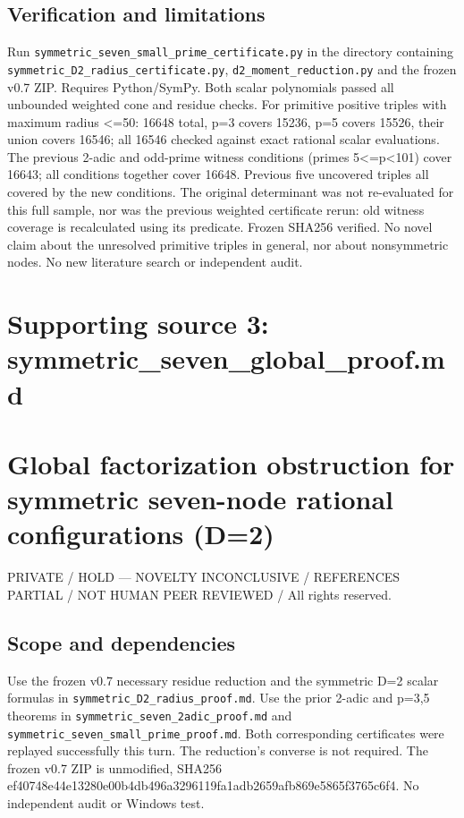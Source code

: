 \documentclass[
  10pt,
]{article}
\begin{document}
\subsection{Verification and
limitations}\label{verification-and-limitations}

Run \texttt{symmetric\_seven\_small\_prime\_certificate.py} in the
directory containing \texttt{symmetric\_D2\_radius\_certificate.py},
\texttt{d2\_moment\_reduction.py} and the frozen v0.7 ZIP. Requires
Python/SymPy. Both scalar polynomials passed all unbounded weighted cone
and residue checks. For primitive positive triples with maximum radius
\textless=50: 16648 total, p=3 covers 15236, p=5 covers 15526, their
union covers 16546; all 16546 checked against exact rational scalar
evaluations. The previous 2-adic and odd-prime witness conditions
(primes 5\textless=p\textless101) cover 16643; all conditions together
cover 16648. Previous five uncovered triples all covered by the new
conditions. The original determinant was not re-evaluated for this full
sample, nor was the previous weighted certificate rerun: old witness
coverage is recalculated using its predicate. Frozen SHA256 verified. No
novel claim about the unresolved primitive triples in general, nor about
nonsymmetric nodes. No new literature search or independent audit.

\newpage

\section{Supporting source 3:
symmetric\_seven\_global\_proof.md}\label{supporting-source-3-symmetric_seven_global_proof.md}

\section{Global factorization obstruction for symmetric seven-node
rational configurations
(D=2)}\label{global-factorization-obstruction-for-symmetric-seven-node-rational-configurations-d2}

PRIVATE / HOLD --- NOVELTY INCONCLUSIVE / REFERENCES PARTIAL / NOT HUMAN
PEER REVIEWED / All rights reserved.

\subsection{Scope and dependencies}\label{scope-and-dependencies-1}

Use the frozen v0.7 necessary residue reduction and the symmetric D=2
scalar formulas in \texttt{symmetric\_D2\_radius\_proof.md}. Use the
prior 2-adic and p=3,5 theorems in
\texttt{symmetric\_seven\_2adic\_proof.md} and
\texttt{symmetric\_seven\_small\_prime\_proof.md}. Both corresponding
certificates were replayed successfully this turn. The reduction's
converse is not required. The frozen v0.7 ZIP is unmodified, SHA256
ef40748e44e13280e00b4db496a3296119fa1adb2659afb869e5865f3765c6f4. No
independent audit or Windows test.
\end{document}
